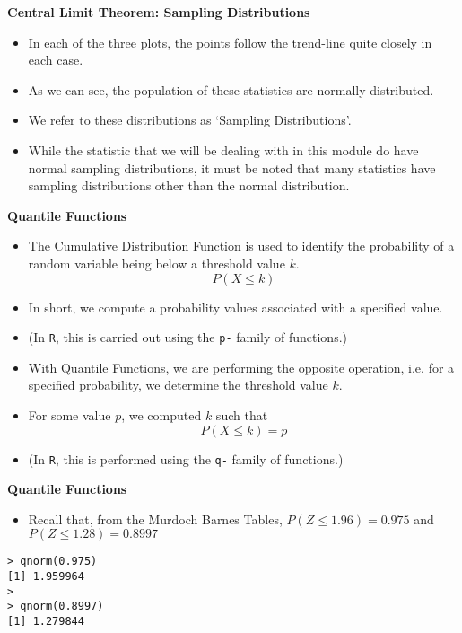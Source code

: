 \documentclass[]{report}
\begin{document}
\textbf{Central Limit Theorem: Sampling Distributions}
\begin{itemize}
\item In each of the three plots, the points follow the trend-line quite closely in each case.
\item As we can see, the population of these statistics are normally distributed.
\item We refer to these distributions as `Sampling Distributions'.
\item While the statistic that we will be dealing with in this module do have normal sampling distributions, it must be noted that many statistics have sampling distributions other than the normal distribution.
\end{itemize}


\textbf{Quantile Functions}
\begin{itemize} \item The Cumulative Distribution Function is used to identify the probability of a random variable being below a threshold value $k$.
\[P(X \leq k) \]

\item In short, we compute a probability values associated with a specified value.
\item (In \texttt{R}, this is carried out using the \texttt{p-} family of functions.)
\item With Quantile Functions, we are performing the opposite operation, i.e. for a specified probability, we determine the threshold value $k$.
\item For some value $p$, we computed $k$ such that
\[P(X \leq k) = p\]
\item (In \texttt{R}, this is performed using the \texttt{q-} family of functions.)
\end{itemize}





\textbf{Quantile Functions}
\begin{itemize}
\item Recall that, from the Murdoch Barnes Tables, $P(Z \leq 1.96) = 0.975$ and $P(Z \leq 1.28) = 0.8997$
\end{itemize}
\begin{verbatim}
> qnorm(0.975)
[1] 1.959964
>
> qnorm(0.8997)
[1] 1.279844
\end{verbatim}
\end{document}
